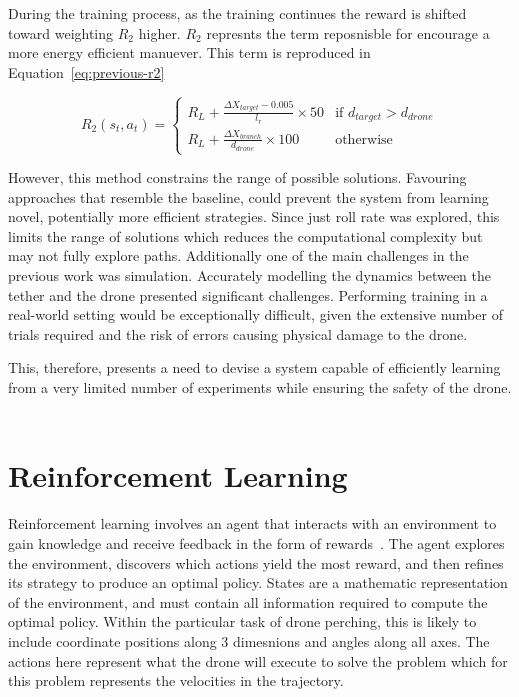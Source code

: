 During the training process, as the training continues the reward is shifted toward weighting $R_2$ higher.
$R_2$ represnts the term reposnisble for encourage a more energy efficient manuever.
This term is reproduced in Equation~\ref{eq:previous-r2}

\begin{equation}
  R_{2}(s_{t}, a_{t}) =
  \begin{cases}
    R_{L} + \frac{\Delta X_{target} - 0.005}{l_{r}} \times 50 & \text{if } d_{target} > d_{drone} \\
    R_{L} + \frac{\Delta X_{branch}}{d_{drone}} \times 100 & \text{otherwise}
  \end{cases}
  \label{eq:previous-r2}
\end{equation}

However, this method constrains the range of possible solutions.
Favouring approaches that resemble the baseline, could prevent the system from learning novel, potentially more efficient strategies.
Since just roll rate was explored, this limits the range of solutions which reduces the computational complexity but may not fully explore paths.
Additionally one of the main challenges in the previous work was simulation.
Accurately modelling the dynamics between the tether and the drone presented significant challenges.
Performing training in a real-world setting would be exceptionally difficult, given the extensive number of trials required and the risk of errors causing physical damage to the drone.

This, therefore, presents a need to devise a system capable of efficiently learning from a very limited number of experiments while ensuring the safety of the drone. \\\\

\section{Reinforcement Learning}
Reinforcement learning involves an agent that interacts with an environment to gain knowledge and receive feedback in the form of rewards~\cite{rlIntroSuttonBarlo}.
The agent explores the environment, discovers which actions yield the most reward, and then refines its strategy to produce an optimal policy.
States are a mathematic representation of the environment, and must contain all information required to compute the optimal policy.
Within the particular task of drone perching, this is likely to include coordinate positions along 3 dimesnions and angles along all axes.
The actions here represent what the drone will execute to solve the problem which for this problem represents the velocities in the trajectory.

